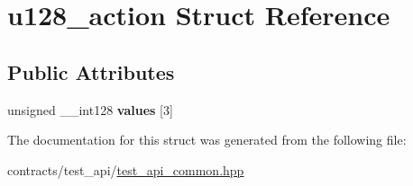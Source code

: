 \hypertarget{structu128__action}{}\section{u128\+\_\+action Struct Reference}
\label{structu128__action}
\subsection*{Public Attributes}
\begin{DoxyCompactItemize}
\item 
\mbox{\label{structu128__action_a85ed201a484441765280edc0b3e02725}} 
unsigned \+\_\+\+\_\+int128 {\bfseries values} \mbox{[}3\mbox{]}
\end{DoxyCompactItemize}


The documentation for this struct was generated from the following file\+:\begin{DoxyCompactItemize}
\item 
contracts/test\+\_\+api/\mbox{\hyperlink{test__api__common_8hpp}{test\+\_\+api\+\_\+common.\+hpp}}\end{DoxyCompactItemize}
